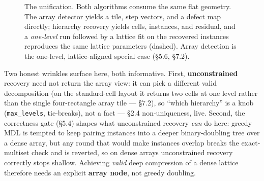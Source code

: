 \documentclass[
  11pt,
]{article}
\begin{document}
\begin{figure}[htb]\centering
{}
\caption{The unification. Both algorithms consume the same flat geometry. The array detector yields a tile, step vectors, and a defect map directly; hierarchy recovery yields cells, instances, and residual, and a \emph{one-level} run followed by a lattice fit on the recovered instances reproduces the same lattice parameters (dashed). Array detection is the one-level, lattice-aligned special case (\S5.6, \S7.2).}
\label{fig:unify}
\end{figure}

Two honest wrinkles surface here, both informative. First,
\textbf{unconstrained} recovery need not return the array view: it can
pick a different valid decomposition (on the standard-cell layout it
returns two cells at one level rather than the single four-rectangle
array tile --- §7.2), so ``which hierarchy'' is a knob
(\texttt{max\_levels}, tie-breaks), not a fact --- §2.4 non-uniqueness,
live. Second, the correctness gate (§5.4) shapes what unconstrained
recovery \emph{can} do here: greedy MDL is tempted to keep pairing
instances into a deeper binary-doubling tree over a dense array, but any
round that would make instances overlap breaks the exact-multiset check
and is reverted, so on dense arrays unconstrained recovery correctly
stops shallow. Achieving \emph{valid} deep compression of a dense
lattice therefore needs an explicit \textbf{array node}, not greedy
doubling.
\end{document}
